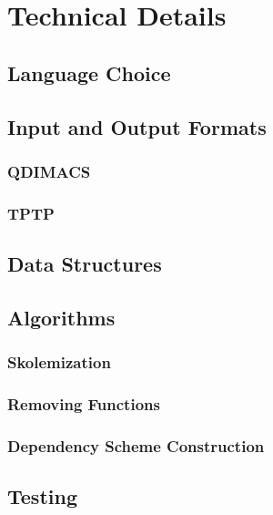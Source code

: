 \chapter{Technical Details}

\section{Language Choice}

\section{Input and Output Formats}
\subsection{QDIMACS}
\subsection{TPTP}

\section{Data Structures}

\section{Algorithms}
\subsection{Skolemization}
\subsection{Removing Functions}
\subsection{Dependency Scheme Construction}

\section{Testing}
